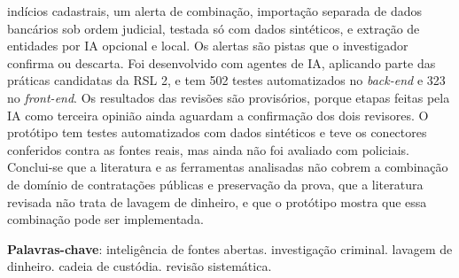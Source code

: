 \begin{resumo}
 indícios cadastrais, um alerta de combinação, importação separada de dados
 bancários sob ordem judicial, testada só com dados sintéticos, e extração
 de entidades por IA opcional e local. Os alertas são pistas que o
 investigador confirma ou descarta. Foi
 desenvolvido com agentes de IA, aplicando parte das práticas candidatas da
 RSL 2, e tem
 502 testes automatizados no \textit{back-end} e 323 no \textit{front-end}.
 Os resultados das revisões são provisórios, porque etapas feitas pela IA
 como terceira opinião ainda aguardam a confirmação dos dois revisores. O
 protótipo tem testes automatizados com dados sintéticos e teve os conectores
 conferidos contra as fontes reais, mas ainda não foi avaliado com policiais. Conclui-se que a literatura
 e as ferramentas analisadas não cobrem a combinação de domínio de
 contratações públicas e preservação da prova, que a literatura revisada não
 trata de lavagem de dinheiro, e que o protótipo mostra que essa combinação
 pode ser implementada.

 \vspace{\onelineskip}

 \noindent
 \textbf{Palavras-chave}: inteligência de fontes abertas. investigação
 criminal. lavagem de dinheiro. cadeia de custódia. revisão sistemática.
\end{resumo}
